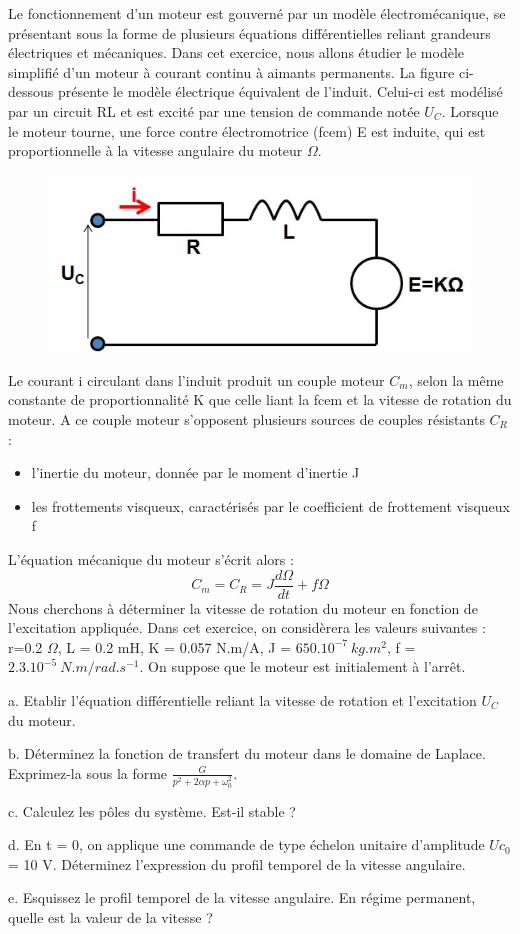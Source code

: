 	Le fonctionnement d'un moteur est gouverné par un modèle électromécanique, se présentant sous la forme de plusieurs équations différentielles reliant grandeurs électriques et mécaniques. Dans cet exercice, nous allons étudier le modèle simplifié d'un moteur à courant continu à aimants permanents. La figure ci-dessous présente le modèle électrique équivalent de l'induit. Celui-ci est modélisé par un circuit RL et est excité par une tension de commande notée $U_{C}$. Lorsque le moteur tourne, une force contre électromotrice (fcem) E est induite, qui est proportionnelle à la vitesse angulaire du moteur $\Omega$. 
	\begin{figure}[h!]
		\centering
		\includegraphics[scale=0.5]{images/Exo3_moteur.jpg} 
	\end{figure}	
	Le courant i circulant dans l'induit produit un couple moteur $C_{m}$, selon la même constante de proportionnalité K que celle liant la fcem et la vitesse de rotation du moteur. A ce couple moteur s'opposent plusieurs sources de couples résistants $C_{R}$ :
	\begin{itemize}
		\item l'inertie du moteur, donnée par le moment d'inertie J
		\item les frottements visqueux, caractérisés par le coefficient de frottement visqueux f
	\end{itemize}
	L'équation mécanique du moteur s'écrit alors :
	\begin{equation*}
	C_{m} = C_{R} = J\frac{d\Omega}{dt}+f\Omega
	\end{equation*}	
	Nous cherchons à déterminer la vitesse de rotation du moteur en fonction de l'excitation appliquée.
	Dans cet exercice, on considèrera les valeurs suivantes : r=0.2 $\Omega$, L = 0.2 mH, K = 0.057 N.m/A, J = $650.10^{-7}~kg.m^{2}$, f = $2.3.10^{-5}~N.m/rad.s^{-1}$. On suppose que le moteur est initialement à l'arrêt.
	
	a. Etablir l'équation différentielle reliant la vitesse de rotation et l'excitation $U_{C}$ du moteur.
	
	b. Déterminez la fonction de transfert du moteur dans le domaine de Laplace. Exprimez-la sous la forme $\frac{G}{p^{2}+2\alpha p+\omega_{0}^{2}}$.
	
	c. Calculez les pôles du système. Est-il stable ?
	
	d. En t = 0, on applique une commande de type échelon unitaire d'amplitude $Uc_{0}$ = 10 V. Déterminez l'expression du profil temporel de la vitesse angulaire.
	
	e. Esquissez le profil temporel de la vitesse angulaire. En régime permanent, quelle est la valeur de la vitesse ? 
	
	
	
		
	\newpage
	